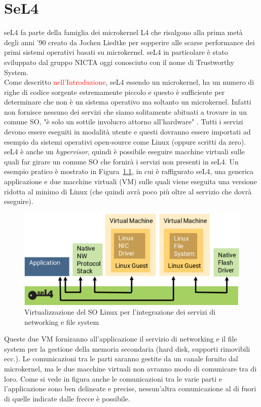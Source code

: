 \chapter{SeL4}
seL4 fa parte della famiglia dei microkernel L4 che risalgono alla prima metà degli anni '90 creato da Jochen Liedtke per sopperire alle scarse performance dei primi sistemi operativi basati su microkernel. seL4 in particolare è stato sviluppato dal gruppo NICTA oggi conosciuto con il nome di Trustworthy System.\\
Come descritto \textcolor{red}{nell'Introduzione}, seL4 essendo un microkernel, ha un numero di righe di codice sorgente estremamente piccolo e questo è sufficiente per determinare che non è un sistema operativo ma soltanto un microkernel. Infatti non fornisce nessuno dei servizi che siamo solitamente abituati a trovare in un comune SO, "è solo un sottile involucro attorno all'hardware" \cite{sel4-whitepaper}. Tutti i servizi devono essere eseguiti in modalità utente e questi dovranno essere importati ad esempio da sistemi operativi open-source come Linux (oppure scritti da zero). seL4 è anche un \textit{hypervisor}, quindi è possibile eseguire macchine virtuali sulle quali far girare un comune SO che fornirà i servizi non presenti in seL4.
Un esempio pratico è mostrato in Figura~\ref{fig:Virtualizzazione}, in cui è raffigurato seL4, una generica applicazione e due macchine virtuali (VM) sulle quali viene eseguita una versione ridotta al minimo di Linux (che quindi avrà poco più oltre al servizio che dovrà eseguire).
\begin{figure}[h]
  \includegraphics[width=\linewidth]{img/seL4Hypervisor.png}
  \caption{Virtualizzazione del SO Linux per l'integrazione dei servizi di networking e file system}
  \label{fig:Virtualizzazione}
\end{figure}
Queste due VM forniranno all'applicazione il servizio di networking e il file system per la gestione della memoria secondaria (hard disk, supporti rimovibili ecc.). Le comunicazioni tra le parti saranno gestite da un canale fornito dal microkernel, ma le due macchine virtuali non avranno modo di comunicare tra di loro. Come si vede in figura anche le comunicazioni tra le varie parti e l'applicazione sono ben delineate e precise, nessun'altra comunicazione al di fuori di quelle indicate dalle frecce è possibile.

